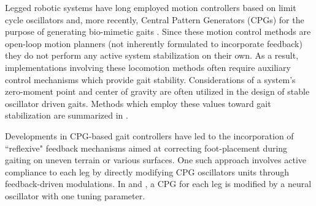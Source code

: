 
Legged robotic systems have long employed motion controllers based on limit cycle oscillators and, more recently, Central Pattern Generators (CPGs)  for the purpose of generating bio-mimetic gaits \cite{Matsuoka1985,Collins1993,Endo2004,Righetti2006,Ijspeert2008,Matos2010,Ajallooeian2013,Park2014,Fukuoka2015}. Since these motion control methods are open-loop motion planners (\IE not inherently formulated to incorporate feedback) they do not perform any active system stabilization on their own. As a result, implementations involving these locomotion methods often require auxiliary control mechanisms which provide gait stability. Considerations of a system's zero-moment point and center of gravity are often utilized in the design of stable oscillator driven gaits. Methods which employ these values toward gait stabilization are summarized in \cite{Wieber2015}. %

Developments in CPG-based gait controllers have led to the incorporation of ``reflexive" feedback mechanisms aimed at correcting foot-placement during gaiting on uneven terrain or various surfaces. One such approach involves active compliance to each leg by directly modifying CPG oscillators units through feedback-driven modulations. In  \cite{Fukuoka2003} and \cite{Endo2004}, a CPG for each leg is modified by a neural oscillator with one tuning parameter.  


